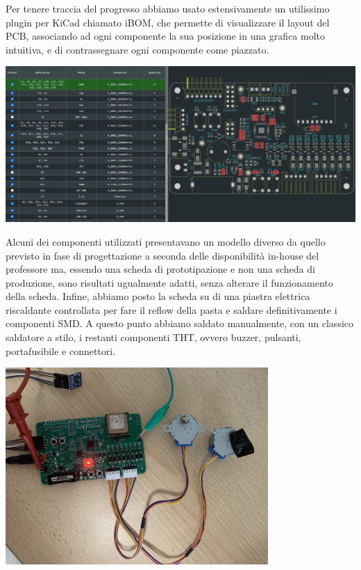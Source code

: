 \noindent Per tenere traccia del progresso abbiamo usato estensivamente un utilissimo plugin per KiCad chiamato iBOM, che permette di visualizzare il layout del PCB, associando ad ogni componente la sua posizione in una grafica molto intuitiva, e di contrassegnare ogni componente come piazzato.

\begin{center}
\includegraphics[width=\textwidth]{figures/image108.png}
\captionsetup{type=figure}
\end{center}

\noindent Alcuni dei componenti utilizzati presentavano un modello diverso da quello previsto in fase di progettazione a seconda delle disponibilità in-house del professore ma, essendo una scheda di prototipazione e non una scheda di produzione, sono risultati ugualmente adatti, senza alterare il funzionamento della scheda. Infine, abbiamo posto la scheda su di una piastra elettrica riscaldante controllata per fare il reflow della pasta e saldare definitivamente i componenti SMD. A questo punto abbiamo saldato manualmente, con un classico saldatore a stilo, i restanti componenti THT, ovvero buzzer, pulsanti, portafusibile e connettori.

\begin{center}
    \includegraphics[width=10cm]{figures/image101.png}
    \captionsetup{type=figure}
\end{center}

